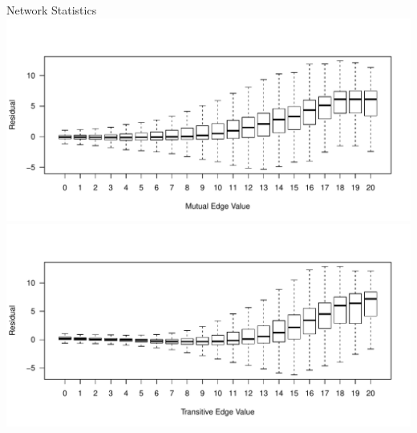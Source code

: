 \documentclass{beamer}
\begin{document}
\begin{frame}{Network Statistics}
\centering
  \includegraphics[scale=.45, clip=true, trim=0cm .5cm 0cm 1.9cm]{slides_figures/mutualBoxplot.pdf}\vfill
   \includegraphics[scale=.45, clip=true, trim=0cm .5cm 0cm 1.9cm]{slides_figures/transitiveBoxplot.pdf}

\end{frame}
\end{document}
